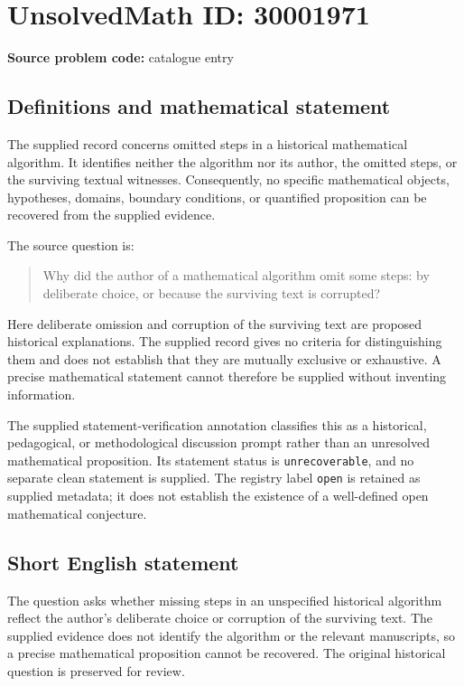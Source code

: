 \documentclass[11pt]{article}
\begin{document}
\section*{UnsolvedMath ID: 30001971}
\textbf{Source problem code:} catalogue entry
\subsection{Definitions and mathematical statement}
The supplied record concerns omitted steps in a historical mathematical algorithm. It identifies neither the algorithm nor its author, the omitted steps, or the surviving textual witnesses. Consequently, no specific mathematical objects, hypotheses, domains, boundary conditions, or quantified proposition can be recovered from the supplied evidence.

The source question is:
\begin{quote}
Why did the author of a mathematical algorithm omit some steps: by deliberate choice, or because the surviving text is corrupted?
\end{quote}
Here deliberate omission and corruption of the surviving text are proposed historical explanations. The supplied record gives no criteria for distinguishing them and does not establish that they are mutually exclusive or exhaustive. A precise mathematical statement cannot therefore be supplied without inventing information.

The supplied statement-verification annotation classifies this as a historical, pedagogical, or methodological discussion prompt rather than an unresolved mathematical proposition. Its statement status is \texttt{unrecoverable}, and no separate clean statement is supplied. The registry label \texttt{open} is retained as supplied metadata; it does not establish the existence of a well-defined open mathematical conjecture.
\subsection{Short English statement}
The question asks whether missing steps in an unspecified historical algorithm reflect the author's deliberate choice or corruption of the surviving text. The supplied evidence does not identify the algorithm or the relevant manuscripts, so a precise mathematical proposition cannot be recovered. The original historical question is preserved for review.
\end{document}
